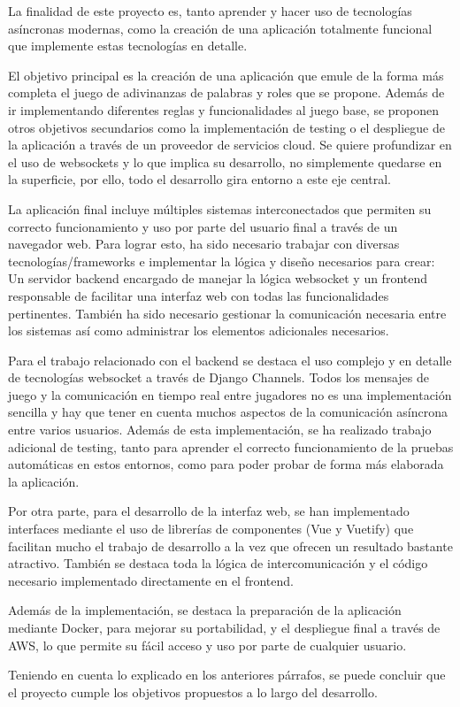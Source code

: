 La finalidad de este proyecto es, tanto aprender y hacer uso de tecnologías
asíncronas modernas, como la creación de una aplicación totalmente funcional 
que implemente estas tecnologías en detalle.

El objetivo principal es la creación de una aplicación que emule de la forma más
completa el juego de adivinanzas de palabras y roles que se propone. Además de ir implementando
diferentes reglas y funcionalidades al juego base, se proponen otros objetivos secundarios
como la implementación de testing o el despliegue de la aplicación a través de un proveedor de 
servicios cloud. Se quiere profundizar en el uso de websockets y lo que implica su desarrollo, no
simplemente quedarse en la superficie, por ello, todo el desarrollo gira entorno a este eje
central. 

La aplicación final incluye múltiples sistemas interconectados que permiten su correcto
funcionamiento y uso por parte del usuario final a través de un navegador web. Para lograr esto, 
ha sido necesario trabajar con diversas tecnologías/frameworks e implementar la lógica y diseño 
necesarios para crear: Un servidor backend encargado de manejar la lógica websocket y un frontend
responsable de facilitar una interfaz web con todas las funcionalidades pertinentes. 
También ha sido necesario gestionar la comunicación necesaria entre los sistemas así como administrar
los elementos adicionales necesarios.

Para el trabajo relacionado con el backend se destaca el uso complejo y en detalle de tecnologías
websocket a través de Django Channels. Todos los mensajes de juego y la comunicación en tiempo real
entre jugadores no es una implementación sencilla y hay que tener en cuenta muchos 
aspectos de la comunicación asíncrona entre varios usuarios. Además de esta implementación,
se ha realizado trabajo adicional de testing, tanto para aprender el correcto funcionamiento 
de la pruebas automáticas en estos entornos, como para poder probar de forma más 
elaborada la aplicación.

Por otra parte, para el desarrollo de la interfaz web, se han implementado interfaces
 mediante el uso de librerías de componentes (Vue y Vuetify) que facilitan mucho el trabajo de desarrollo
a la vez que ofrecen un resultado bastante atractivo. También se destaca toda la lógica de
intercomunicación y el código necesario implementado directamente en el frontend.

Además de la implementación, se destaca la preparación de la aplicación mediante Docker, 
para mejorar su portabilidad, y el despliegue final a través de AWS, 
lo que permite su fácil acceso y uso por parte de cualquier usuario.

Teniendo en cuenta lo explicado en los anteriores párrafos, se puede concluir
que el proyecto cumple los objetivos propuestos a lo largo del desarrollo.

